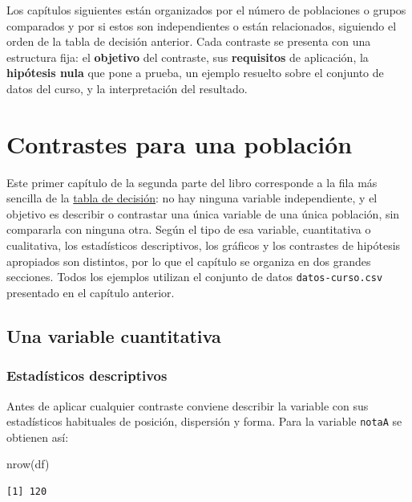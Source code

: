 \documentclass[
  spanish,
  a4paper,
]{scrreport}
\newenvironment{Shaded}{\begin{snugshade}}{\end{snugshade}}
\newcommand{\FunctionTok}[1]{\textcolor[rgb]{0.28,0.35,0.67}{#1}}
\newcommand{\NormalTok}[1]{\textcolor[rgb]{0.00,0.23,0.31}{#1}}
\theoremstyle{definition}
\theoremstyle{definition}
\theoremstyle{remark}
\begin{document}
Los capítulos siguientes están organizados por el número de poblaciones
o grupos comparados y por si estos son independientes o están
relacionados, siguiendo el orden de la tabla de decisión anterior. Cada
contraste se presenta con una estructura fija: el \textbf{objetivo} del
contraste, sus \textbf{requisitos} de aplicación, la \textbf{hipótesis
nula} que pone a prueba, un ejemplo resuelto sobre el conjunto de datos
del curso, y la interpretación del resultado.

\chapter{Contrastes para una
población}\label{contrastes-para-una-poblaciuxf3n}

Este primer capítulo de la segunda parte del libro corresponde a la fila
más sencilla de la
\hyperref[selecciuxf3n-del-contraste-estaduxedstico-1]{tabla de
decisión}: no hay ninguna variable independiente, y el objetivo es
describir o contrastar una única variable de una única población, sin
compararla con ninguna otra. Según el tipo de esa variable, cuantitativa
o cualitativa, los estadísticos descriptivos, los gráficos y los
contrastes de hipótesis apropiados son distintos, por lo que el capítulo
se organiza en dos grandes secciones. Todos los ejemplos utilizan el
conjunto de datos \texttt{datos-curso.csv} presentado en el capítulo
anterior.

\section{Una variable cuantitativa}\label{una-variable-cuantitativa}

\subsection{Estadísticos
descriptivos}\label{estaduxedsticos-descriptivos}

Antes de aplicar cualquier contraste conviene describir la variable con
sus estadísticos habituales de posición, dispersión y forma. Para la
variable \texttt{notaA} se obtienen así:

\begin{Shaded}
\begin{Highlighting}[]
\FunctionTok{nrow}\NormalTok{(df)}
\end{Highlighting}
\end{Shaded}

\begin{verbatim}
[1] 120
\end{verbatim}
\end{document}
